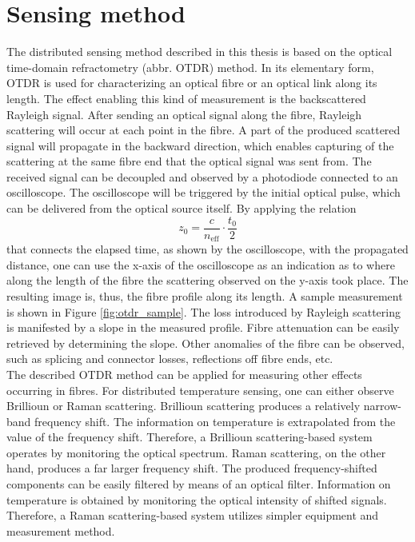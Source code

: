 \documentclass{standalone}
\begin{document}
\chapter{Sensing method}
\setcounter{page}\thestranica


The distributed sensing method described in this thesis is based on the optical time-domain refractometry (abbr. OTDR) method. In its elementary form, OTDR is used for characterizing an optical fibre or an optical link along its length. The effect enabling this kind of measurement is the backscattered Rayleigh signal. After sending an optical signal along the fibre, Rayleigh scattering will occur at each point in the fibre. A part of the produced scattered signal will propagate in the backward direction, which enables capturing of the scattering at the same fibre end that the optical signal was sent from. The received signal can be decoupled and observed by a photodiode connected to an oscilloscope. The oscilloscope will be triggered by the initial optical pulse, which can be delivered from the optical source itself. By applying the relation 
\begin{equation} \label{eq:otdr_time_distance}
z_0 = \frac{c}{n_\textrm{eff}} \cdot \frac{t_0}{2}
\end{equation}
that connects the elapsed time, as shown by the oscilloscope, with the propagated distance, one can use the x-axis of the oscilloscope as an indication as to where along the length of the fibre the scattering observed on the y-axis took place. The resulting image is, thus, the fibre profile along its length. A sample measurement is shown in Figure \ref{fig:otdr_sample}.
The loss introduced by Rayleigh scattering is manifested by a slope in the measured profile. Fibre attenuation can be easily retrieved by determining the slope. Other anomalies of the fibre can be observed, such as splicing and connector losses, reflections off fibre ends, etc. 
\\

The described OTDR method can be applied for measuring other effects occurring in fibres. For distributed temperature sensing, one can either observe Brillioun or Raman scattering. Brillioun scattering produces a relatively narrow-band frequency shift. The information on temperature is extrapolated from the value of the frequency shift. Therefore, a Brillioun scattering-based system operates by monitoring the optical spectrum. Raman scattering, on the other hand, produces a far larger frequency shift. The produced frequency-shifted components can be easily filtered by means of an optical filter. Information on temperature is obtained by monitoring the optical intensity of shifted signals. Therefore, a Raman scattering-based system utilizes simpler equipment and measurement method. 



\setcounter{stranica}{\thepage}
\addtocounter{stranica}{1}
\end{document}
